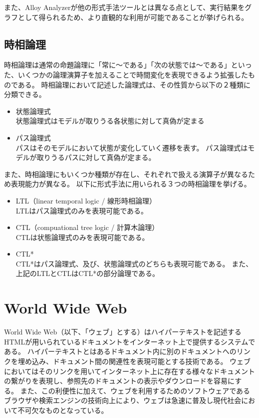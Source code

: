 \documentclass[12pt,a4paper]{jbook}
\begin{document}
また、Alloy Analyzerが他の形式手法ツールとは異なる点として、実行結果をグラフとして得られるため、より直観的な利用が可能であることが挙げられる。

\subsection{時相論理}
\label{sec:TemporalLogic}
時相論理は通常の命題論理に「常に～である」「次の状態では～である」といった、いくつかの論理演算子を加えることで時間変化を表現できるよう拡張したものである。
時相論理において記述した論理式は、その性質から以下の２種類に分類できる。
\begin{itemize}
\item 状態論理式\\
状態論理式はモデルが取りうる各状態に対して真偽が定まる
\item パス論理式\\
パスはそのモデルにおいて状態が変化していく遷移を表す。
パス論理式はモデルが取りうるパスに対して真偽が定まる。
\end{itemize}

また、時相論理にもいくつか種類が存在し、それぞれで扱える演算子が異なるため表現能力が異なる。
以下に形式手法に用いられる３つの時相論理を挙げる。
\begin{itemize}
\item LTL（linear temporal logic / 線形時相論理）\\
LTLはパス論理式のみを表現可能である。
\item CTL（compuational tree logic / 計算木論理）\\
CTLは状態論理式のみを表現可能である。
\item CTL*\\
CTL*はパス論理式、及び、状態論理式のどちらも表現可能である。
また、上記のLTLとCTLはCTL*の部分論理である。
\end{itemize}

\section{World Wide Web}
\color{red}
World Wide Web（以下、「ウェブ」とする）はハイパーテキストを記述するHTMLが用いられているドキュメントをインターネット上で提供するシステムである。
ハイパーテキストとはあるドキュメント内に別のドキュメントへのリンクを埋め込み、ドキュメント間の関連性を表現可能とする技術である。
\color{black}
ウェブにおいてはそのリンクを用いてインターネット上に存在する様々なドキュメントの繋がりを表現し、参照先のドキュメントの表示やダウンロードを容易にする。
また、この利便性に加えて、ウェブを利用するためのソフトウェアであるブラウザや検索エンジンの技術向上により、ウェブは急速に普及し現代社会において不可欠なものとなっている。
\end{document}
